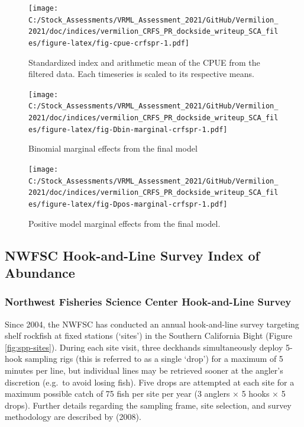 \documentclass[11pt,
  english,
  a4paper,
]{article}
\begin{document}
\begin{figure}
\centering
\texttt{[image: C:/Stock\_Assessments/VRML\_Assessment\_2021/GitHub/Vermilion\_2021/doc/indices/vermilion\_CRFS\_PR\_dockside\_writeup\_SCA\_files/figure-latex/fig-cpue-crfspr-1.pdf]}
\caption{\label{fig:fig-cpue-crfspr}Standardized index and arithmetic mean of the CPUE from the filtered data. Each timeseries is scaled to its respective means.}
\end{figure}

\begin{figure}
\centering
\texttt{[image: C:/Stock\_Assessments/VRML\_Assessment\_2021/GitHub/Vermilion\_2021/doc/indices/vermilion\_CRFS\_PR\_dockside\_writeup\_SCA\_files/figure-latex/fig-Dbin-marginal-crfspr-1.pdf]}
\caption{\label{fig:fig-Dbin-marginal-crfspr}Binomial marginal effects from the final model}
\end{figure}

\begin{figure}
\centering
\texttt{[image: C:/Stock\_Assessments/VRML\_Assessment\_2021/GitHub/Vermilion\_2021/doc/indices/vermilion\_CRFS\_PR\_dockside\_writeup\_SCA\_files/figure-latex/fig-Dpos-marginal-crfspr-1.pdf]}
\caption{\label{fig:fig-Dpos-marginal-crfspr}Positive model marginal effects from the final model.}
\end{figure}

\clearpage


\hypertarget{nwfschl-index}{%
\subsection{NWFSC Hook-and-Line Survey Index of Abundance}\label{nwfschl-index}}

\leavevmode\tagmcend\tagstructend


\hypertarget{northwest-fisheries-science-center-hook-and-line-survey}{%
\subsubsection{Northwest Fisheries Science Center Hook-and-Line Survey}\label{northwest-fisheries-science-center-hook-and-line-survey}}

\leavevmode\tagmcend\tagstructend

Since 2004, the NWFSC has conducted an annual hook-and-line survey targeting shelf rockfish at fixed stations (`sites') in the Southern California Bight (Figure \ref{fig:spp-sites}). During each site visit, three deckhands simultaneously deploy 5-hook sampling rigs (this is referred to as a single `drop') for a maximum of 5 minutes per line, but individual lines may be retrieved sooner at the angler's discretion (e.g.~to avoid losing fish). Five drops are attempted at each site for a maximum possible catch of 75 fish per site per year (3 anglers × 5 hooks × 5 drops). Further details regarding the sampling frame, site selection, and survey methodology are described by {(2008)\leavevmode\tagmcend\tagstructend}.
\end{document}
